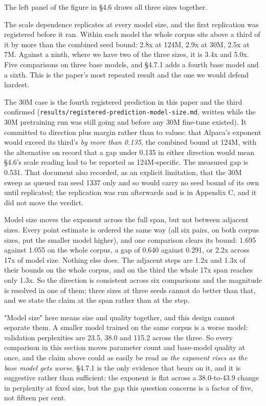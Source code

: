 \documentclass[11pt]{article}
\begin{document}
The left panel of the figure in \S{}4.6 draws all three sizes together.

The scale dependence replicates at every model size, and the first replication was registered before it ran. Within each model the whole corpus sits above a third of it by more than the combined seed bound: 2.8x at 124M, 2.9x at 30M, 2.5x at 7M. Against a ninth, where we have two of the three sizes, it is 3.4x and 5.0x. Five comparisons on three base models, and \S{}4.7.1 adds a fourth base model and a sixth. This is the paper's most repeated result and the one we would defend hardest.

The 30M case is the fourth registered prediction in this paper and the third confirmed (\texttt{results/\allowbreak{}registered-prediction-model-size.md}, written while the 30M pretraining run was still going and before any 30M fine-tune existed). It committed to direction plus margin rather than to values: that Alpaca's exponent would exceed its third's \emph{by more than 0.135}, the combined bound at 124M, with the alternative on record that a gap under 0.135 in either direction would mean \S{}4.6's scale reading had to be reported as 124M-specific. The measured gap is 0.531. That document also recorded, as an explicit limitation, that the 30M sweep as queued ran seed 1337 only and so would carry no seed bound of its own until replicated; the replication was run afterwards and is in Appendix C, and it did not move the verdict.

Model size moves the exponent across the full span, but not between adjacent sizes. Every point estimate is ordered the same way (all six pairs, on both corpus sizes, put the smaller model higher), and one comparison clears its bound: 1.695 against 1.055 on the whole corpus, a gap of 0.640 against 0.291, or 2.2x across 17x of model size. Nothing else does. The adjacent steps are 1.2x and 1.3x of their bounds on the whole corpus, and on the third the whole 17x span reaches only 1.3x. So the direction is consistent across six comparisons and the magnitude is resolved in one of them; three sizes at three seeds cannot do better than that, and we state the claim at the span rather than at the step.

"Model size" here means size and quality together, and this design cannot separate them. A smaller model trained on the same corpus is a worse model: validation perplexities are 23.5, 38.0 and 115.2 across the three. So every comparison in this section moves parameter count and base-model quality at once, and the claim above could as easily be read as \emph{the exponent rises as the base model gets worse}. \S{}4.7.1 is the only evidence that bears on it, and it is suggestive rather than sufficient: the exponent is flat across a 38.0-to-43.9 change in perplexity at fixed size, but the gap this question concerns is a factor of five, not fifteen per cent.
\end{document}
